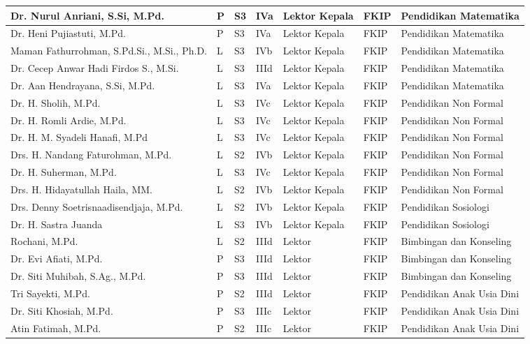 \documentclass[
]{book}
\begin{document}
\begin{longtable}{l|l|l|l|l|l|l}
\hline
Dr. Nurul Anriani, S.Si, M.Pd. & P & S3 & IVa & Lektor Kepala & FKIP & Pendidikan Matematika\\
\hline
Dr. Heni Pujiastuti, M.Pd. & P & S3 & IVa & Lektor Kepala & FKIP & Pendidikan Matematika\\
\hline
Maman Fathurrohman, S.Pd.Si., M.Si., Ph.D. & L & S3 & IVb & Lektor Kepala & FKIP & Pendidikan Matematika\\
\hline
Dr. Cecep Anwar Hadi Firdos S., M.Si. & L & S3 & IIId & Lektor Kepala & FKIP & Pendidikan Matematika\\
\hline
Dr. Aan Hendrayana, S.Si, M.Pd. & L & S3 & IVa & Lektor Kepala & FKIP & Pendidikan Matematika\\
\hline
Dr. H. Sholih, M.Pd. & L & S3 & IVc & Lektor Kepala & FKIP & Pendidikan Non Formal\\
\hline
Dr. H. Romli Ardie, M.Pd. & L & S3 & IVc & Lektor Kepala & FKIP & Pendidikan Non Formal\\
\hline
Dr. H. M. Syadeli Hanafi, M.Pd & L & S3 & IVc & Lektor Kepala & FKIP & Pendidikan Non Formal\\
\hline
Drs. H. Nandang Faturohman, M.Pd. & L & S2 & IVb & Lektor Kepala & FKIP & Pendidikan Non Formal\\
\hline
Dr. H. Suherman, M.Pd. & L & S3 & IVc & Lektor Kepala & FKIP & Pendidikan Non Formal\\
\hline
Drs. H. Hidayatullah Haila, MM. & L & S2 & IVb & Lektor Kepala & FKIP & Pendidikan Non Formal\\
\hline
Drs. Denny Soetrisnaadisendjaja, M.Pd. & L & S2 & IVb & Lektor Kepala & FKIP & Pendidikan Sosiologi\\
\hline
Dr. H. Sastra Juanda & L & S3 & IVb & Lektor Kepala & FKIP & Pendidikan Sosiologi\\
\hline
Rochani, M.Pd. & L & S2 & IIId & Lektor & FKIP & Bimbingan dan Konseling\\
\hline
Dr. Evi Afiati, M.Pd. & P & S3 & IIId & Lektor & FKIP & Bimbingan dan Konseling\\
\hline
Dr. Siti Muhibah, S.Ag., M.Pd. & P & S3 & IIId & Lektor & FKIP & Bimbingan dan Konseling\\
\hline
Tri Sayekti, M.Pd. & P & S2 & IIId & Lektor & FKIP & Pendidikan Anak Usia Dini\\
\hline
Dr. Siti Khosiah, M.Pd. & P & S3 & IIIc & Lektor & FKIP & Pendidikan Anak Usia Dini\\
\hline
Atin Fatimah, M.Pd. & P & S2 & IIIc & Lektor & FKIP & Pendidikan Anak Usia Dini\\

\end{longtable}
\end{document}
